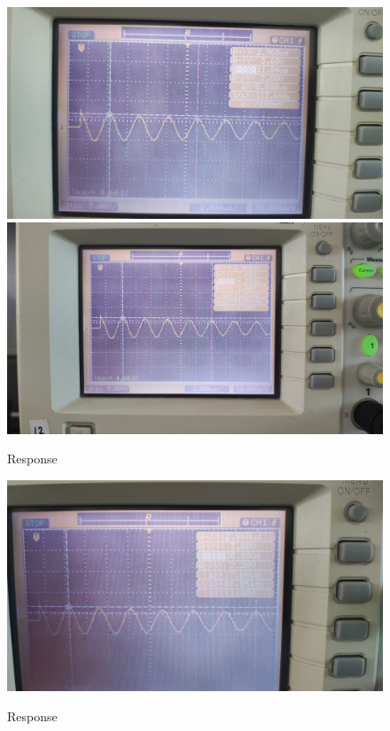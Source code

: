 \documentclass[a4paper,12pt]{article}
\begin{document}
\begin{figure}[!htb]
  {\includegraphics[width=0.5\columnwidth]{fig3.jpeg}}
  \hspace{\fill}
  {\includegraphics[width=0.5\columnwidth]{fig4.jpeg}}
  \caption{Response}
\end{figure}

\begin{figure}[!htb]
  {\includegraphics[width=0.5\columnwidth]{fig5.jpeg}}
  \hspace{\fill}
  \caption{Response}
\end{figure}
\end{document}

